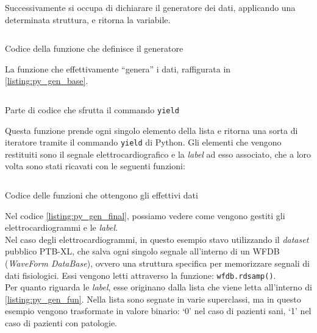 Successivamente si occupa di dichiarare il generatore dei dati, applicando una determinata struttura, e ritorna la variabile.
\begin{listing}[H]
    \inputminted{python}{code/generator_fun.py}
    \caption{Codice della funzione che definisce il generatore}
    \label{listing:py_gen_fun}
\end{listing}\noindent
La funzione che effettivamente ``genera'' i dati, raffigurata in \ref{listing:py_gen_base}.
\begin{listing}[H]
    \inputminted{python}{code/generator_base.py}
    \caption{Parte di codice che sfrutta il commando \texttt{yield}}
    \label{listing:py_gen_base}
\end{listing}\noindent
Questa funzione prende ogni singolo elemento della lista e ritorna una sorta di iteratore tramite il commando \texttt{yield} di Python.
Gli elementi che vengono restituiti sono il segnale elettrocardiografico e la \textit{label} ad esso associato, che a loro volta sono stati ricavati con le seguenti funzioni:
\begin{listing}[H]
    \inputminted{python}{code/generator_final.py}
    \caption{Codice delle funzioni che ottengono gli effettivi dati}
    \label{listing:py_gen_final}
\end{listing}\noindent
Nel codice \ref{listing:py_gen_final}, possiamo vedere come vengono gestiti gli elettrocardiogrammi e le \textit{label.}\\
Nel caso degli elettrocardiogrammi, in questo esempio stavo utilizzando il \textit{dataset} pubblico PTB-XL, che salva ogni singolo segnale all'interno di un WFDB (\textit{WaveForm DataBase}), ovvero una struttura specifica per memorizzare segnali di dati fisiologici. Essi vengono letti attraverso la funzione: \texttt{wfdb.rdsamp()}.\\
Per quanto riguarda le \textit{label}, esse originano dalla lista che viene letta all'interno di \ref{listing:py_gen_fun}. Nella lista sono segnate in varie superclassi, ma in questo esempio vengono trasformate in valore binario: `0' nel caso di pazienti sani, `1' nel caso di pazienti con patologie.

